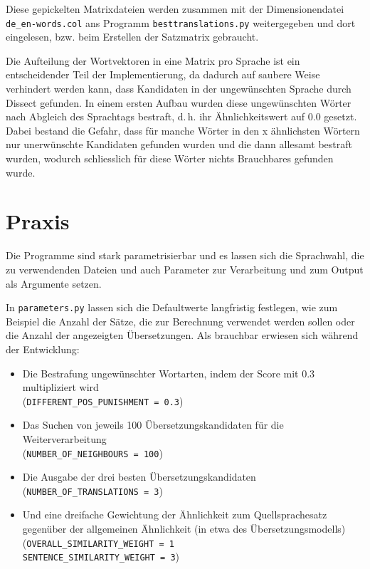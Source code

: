 \documentclass[11pt,twoside,openright]{mpreport}
\begin{document}
Diese gepickelten Matrixdateien werden zusammen mit der Dimensionendatei \verb+de_en-words.col+ ans Programm \verb+besttranslations.py+ weitergegeben und dort eingelesen, bzw. beim Erstellen der Satzmatrix gebraucht.

Die Aufteilung der Wortvektoren in eine Matrix pro Sprache ist ein entscheidender Teil der Implementierung, da dadurch auf saubere Weise verhindert werden kann, dass Kandidaten in der ungewünschten Sprache durch Dissect gefunden. In einem ersten Aufbau wurden diese ungewünschten Wörter nach Abgleich des Sprachtags bestraft, d.\,h. ihr Ähnlichkeitswert auf 0.0 gesetzt. Dabei bestand die Gefahr, dass für manche Wörter in den x ähnlichsten Wörtern nur unerwünschte Kandidaten gefunden wurden und die dann allesamt bestraft wurden, wodurch schliesslich für diese Wörter nichts Brauchbares gefunden wurde.


\chapter{Praxis}
\label{cha:praxis}
Die Programme sind stark parametrisierbar und es lassen sich die Sprachwahl, die zu verwendenden Dateien und auch Parameter zur Verarbeitung und zum Output als Argumente setzen.

In \verb+parameters.py+ lassen sich die Defaultwerte langfristig festlegen, wie zum Beispiel die Anzahl der Sätze, die zur Berechnung verwendet werden sollen oder die Anzahl der angezeigten Übersetzungen. Als brauchbar erwiesen sich während der Entwicklung:
\begin{itemize}
\item Die Bestrafung ungewünschter Wortarten, indem der Score mit 0.3 multipliziert wird\\
(\verb+DIFFERENT_POS_PUNISHMENT = 0.3+)
\item Das Suchen von jeweils 100 Übersetzungskandidaten für die Weiterverarbeitung\\
(\verb+NUMBER_OF_NEIGHBOURS = 100+)
\item Die Ausgabe der drei besten Übersetzungskandidaten\\
(\verb+NUMBER_OF_TRANSLATIONS = 3+)
\item Und eine dreifache Gewichtung der Ähnlichkeit zum Quellsprachesatz gegenüber der allgemeinen Ähnlichkeit (in etwa des Übersetzungsmodells)\\
(\verb+OVERALL_SIMILARITY_WEIGHT = 1+\\
\verb+SENTENCE_SIMILARITY_WEIGHT = 3+)
\end{itemize}
\end{document}
